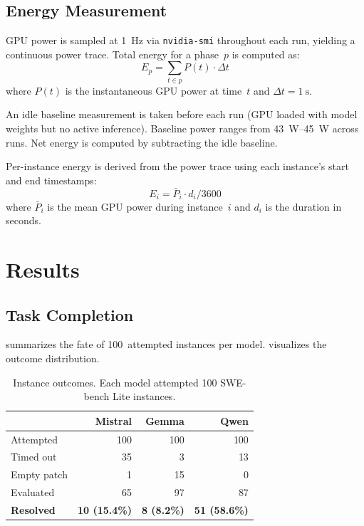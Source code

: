 \documentclass[10pt,twocolumn]{article}
\begin{document}
\subsection{Energy Measurement}
\label{sec:energy}

GPU power is sampled at \SI{1}{\hertz} via \texttt{nvidia-smi}
throughout each run, yielding a continuous power trace.
Total energy for a phase~$p$ is computed as:
\begin{equation}
  E_p = \sum_{t \in p} P(t) \cdot \Delta t
  \label{eq:energy}
\end{equation}
where $P(t)$ is the instantaneous GPU power at time~$t$ and
$\Delta t = \SI{1}{\second}$.

An idle baseline measurement is taken before each run
(GPU loaded with model weights but no active inference).
Baseline power ranges from \SIrange{43}{45}{\watt} across runs.
Net energy is computed by subtracting the idle baseline.

Per-instance energy is derived from the power trace using each
instance's start and end timestamps:
\begin{equation}
  E_i = \bar{P}_i \cdot d_i / 3600
  \label{eq:instance_energy}
\end{equation}
where $\bar{P}_i$ is the mean GPU power during instance~$i$ and
$d_i$ is the duration in seconds.


\section{Results}
\label{sec:results}

\subsection{Task Completion}
\label{sec:completion}

 summarizes the fate of 100~attempted instances
per model.  visualizes the outcome distribution.

\begin{table}[t]
  \centering
  \caption{Instance outcomes. Each model attempted 100
           SWE-bench Lite instances.}
  \label{tab:outcomes}
  \small
  \begin{tabular}{@{}lrrr@{}}
    \toprule
    & \textbf{Mistral} & \textbf{Gemma} & \textbf{Qwen} \\
    \midrule
    Attempted       & 100  & 100 & 100 \\
    Timed out       &  35  &   3 &  13 \\
    Empty patch     &   1  &  15 &   0 \\
    Evaluated       &  65  &  97 &  87 \\
    \textbf{Resolved} & \textbf{10 (15.4\%)} & \textbf{8 (8.2\%)}
                       & \textbf{51 (58.6\%)} \\
    \bottomrule
  \end{tabular}
\end{table}
\end{document}
